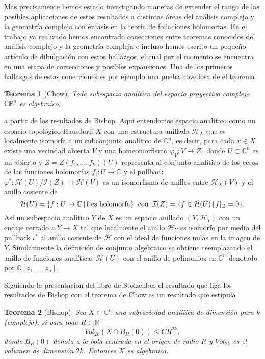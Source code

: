 \documentclass[letterpaper]{report}
\newtheorem{teorema}{Teorema}[chapter]
\newcommand{\co}{\ensuremath{\mathbb C }}
\newcommand{\con}{\ensuremath{\mathbb{C}^n}}
\newcommand{\cp}{\ensuremath{\mathbb{CP}}}
\newcommand{\re}{\ensuremath{\mathbb R }}
\begin{document}
M\'as precisamente hemos estado investigando maneras de extender el rango de las posibles aplicaciones de estos resultados a
distintas \'areas del an\'alisis complejo y la geometr\'ia compleja con \'enfasis en la teor\'ia de foliaciones holomorfas. En el trabajo
ya realizado hemos encontrado conecciones entre teoremas conocidos del an\'alisis complejo y la geometr\'ia compleja e incluso hemos
escrito un pequeño art\'iculo de dibulgaci\'on con estos hallazgos, el cual por el momento se encuentra en una etapa de correcciones
y posibles expansiones. Una de los primeros hallazgos de estas conecciones es por ejemplo una pueba novedosa de el teorema
\begin{teorema}[Chow]\label{Chow}
        Toda subespacio anal\'itico del espacio proyectivo complejo $\cp^{n}$ es algebraico,
\end{teorema}
a partir de los resultados de Bishop. Aqu\'i entendemos espacio anal\'itico como un espacio topol\'ogico Hausdorff $X$ con una 
estructura anillada $\mathcal{H}_X$ que es localmente isomorfa a un subconjunto anal\'itico de $\con$, es decir, para cada $x\in X$
existe una vecindad abierta $V$ y una homeomorfismo $\varphi_V:V\rightarrow Z,$ donde $U\subset\con$ es un abierto y $Z=Z(f_1,\dots,f_k)(U)$ reprecenta al 
conjunto anal\'itico de los ceros de las funciones holomorfas $f_i:U\rightarrow\co$ y el pullback $\varphi^{*}:\mathcal{H}(U)/\mathcal{I}(Z)\rightarrow \mathcal{H}(V)$ 
es un isomorfismo de anillos entre $\mathcal{H}_X(V)$ y el anillo cosiente de
\[
        \mathcal{H}(U)=\{f:U\rightarrow\co\,|\,\text{f es holomorfa}\}\hspace{0.2cm}\text{con}\hspace{0.2cm}\mathcal{I}(Z)=\{f\in\mathcal{H}(U)\,|\,f|_{Z}=0\}.
\]
As\'i un subespacio anal\'itico $Y$ de $X$ es un espacio anillado $(Y,\mathcal{H}_Y)$ con un encaje cerrado $\iota:Y\rightarrow X$ tal que localmente el anillo
$\mathcal{H}_Y$ es isomorfo por medio del pullback $\iota^{*}$ al anillo cosiente de $\mathcal{H}$ con el ideal de funciones nulas en la imagen de $Y$. 
Similarmente la definici\'on de conjunto algebraico se obtiene reemplazando el anillo de funciones anal\'iticas $\mathcal{H}(U)$ con el anillo de 
polinomios en $\con$ denotado por $\co[z_1,\dots,z_n]$.

Siguiendo la presentacion del libro de Stolzenber \cite{Stolzenberg} el resultado que liga 
los resultados de Bishop con el teorema de Chow es un resultado que estipula
\begin{teorema}[Bishop]\label{Bishop1}
        Sea $X\subset\con$ una subvariedad anal\'itica de dimensi\'on pura $k$ (compleja), si para toda $R\in\re^+$
        $$Vol_{2k}(X\cap B_R(0))\leq CR^{2k},$$
        donde $B_R(0)$ denota a la bola centrada en el origen de radio $R$ y $Vol_{2k}$ es el volumen de dimensi\'on $2k$. Entonces $X$ es algebraica.
\end{teorema}
\end{document}
